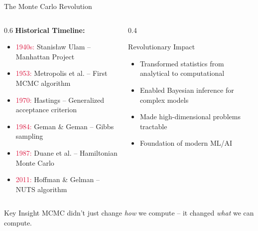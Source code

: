\documentclass[aspectratio=169,11pt]{beamer}
\begin{document}
\begin{frame}{The Monte Carlo Revolution}
\begin{columns}
\begin{column}{0.6\textwidth}
\textbf{Historical Timeline:}
\begin{itemize}
\item \textcolor{crimson}{1940s:} Stanisław Ulam -- Manhattan Project
\item \textcolor{crimson}{1953:} Metropolis et al. -- First MCMC algorithm
\item \textcolor{crimson}{1970:} Hastings -- Generalized acceptance criterion
\item \textcolor{crimson}{1984:} Geman \& Geman -- Gibbs sampling
\item \textcolor{crimson}{1987:} Duane et al. -- Hamiltonian Monte Carlo
\item \textcolor{crimson}{2011:} Hoffman \& Gelman -- NUTS algorithm
\end{itemize}
\end{column}
\begin{column}{0.4\textwidth}
\begin{block}{Revolutionary Impact}
\begin{itemize}
\item Transformed statistics from analytical to computational
\item Enabled Bayesian inference for complex models
\item Made high-dimensional problems tractable
\item Foundation of modern ML/AI
\end{itemize}
\end{block}
\end{column}
\end{columns}
\vspace{0.5cm}
\begin{alertblock}{Key Insight}
MCMC didn't just change \emph{how} we compute -- it changed \emph{what} we can compute.
\end{alertblock}
\end{frame}
\end{document}
